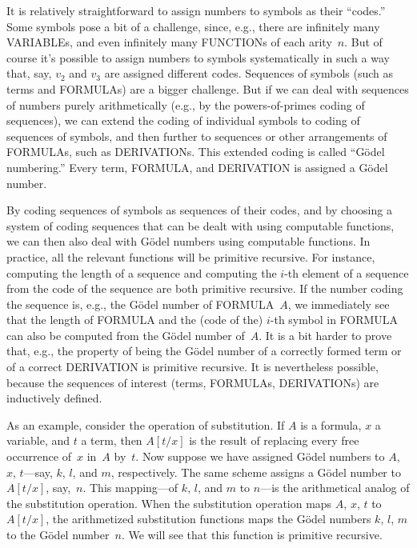 \documentclass[10pt,a4paper]{article}
\newcommand*{\olup}[1]{\MakeUppercase{#1}}
\theoremstyle{plain}
\theoremstyle{definition}
\theoremstyle{remark}
\providecommand{\Subst}[3]{#1[#2/#3]}
\providecommand{\Obj}{}
\begin{document}
It is relatively straightforward to assign numbers to symbols as their
``codes.''  Some symbols pose a bit of a challenge, since, e.g., there
are infinitely many \olup{variable}s, and even infinitely many
\olup{function}s of each arity~$n$. But of course it's possible to assign
numbers to symbols systematically in such a way that, say, $\Obj v_2$
and $\Obj v_3$ are assigned different codes. Sequences of symbols
(such as terms and \olup{formula}s) are a bigger challenge. But if we can
deal with sequences of numbers purely arithmetically (e.g., by the
powers-of-primes coding of sequences), we can extend the coding of
individual symbols to coding of sequences of symbols, and then further
to sequences or other arrangements of \olup{formula}s, such as
\olup{derivation}s. This extended coding is called ``G\"odel numbering.''
Every term, \olup{formula}, and \olup{derivation} is assigned a G\"odel
number.

By coding sequences of symbols as sequences of their codes, and by
choosing a system of coding sequences that can be dealt with using
computable functions, we can then also deal with G\"odel numbers using
computable functions.  In practice, all the relevant functions will be
primitive recursive.  For instance, computing the length of a sequence
and computing the $i$-th element of a sequence from the code of the
sequence are both primitive recursive. If the number coding the
sequence is, e.g., the G\"odel number of \olup{formula}~$A$, we
immediately see that the length of \olup{formula} and the (code of the)
$i$-th symbol in \olup{formula} can also be computed from the G\"odel
number of~$A$. It is a bit harder to prove that, e.g., the property
of being the G\"odel number of a correctly formed term or of a correct
\olup{derivation} is primitive recursive.  It is nevertheless possible,
because the sequences of interest (terms, \olup{formula}s,
\olup{derivation}s) are inductively defined.

As an example, consider the operation of substitution. If $A$ is a
formula, $x$ a variable, and $t$ a term, then $\Subst{A}{t}{x}$ is
the result of replacing every free occurrence of~$x$ in~$A$ by~$t$.
Now suppose we have assigned G\"odel numbers to $A$, $x$, $t$---say,
$k$, $l$, and $m$, respectively.  The same scheme assigns a G\"odel
number to $\Subst{A}{t}{x}$, say,~$n$.  This mapping---of $k$, $l$,
and $m$ to $n$---is the arithmetical analog of the substitution
operation. When the substitution operation maps $A$, $x$, $t$ to
$\Subst{A}{t}{x}$, the arithmetized substitution functions maps the
G\"odel numbers $k$, $l$, $m$ to the G\"odel number~$n$.  We will see
that this function is primitive recursive.
\end{document}
